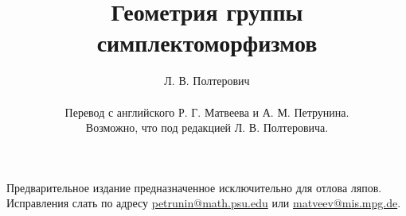 \documentclass[twoside]{book}
\begin{document}

\title{Геометрия группы симплектоморфизмов}
\author{Л. В. Полтерович\\
\\
Перевод с английского  
Р. Г. Матвеева и А. М. Петрунина.
\\
Возможно, что под редакцией Л. В. Полтеровича.
}
\date{}
\maketitle

\thispagestyle{empty}

Предварительное издание предназначенное исключительно для отлова ляпов. 
Исправления слать по адресу 
\url{petrunin@math.psu.edu}
или
\url{matveev@mis.mpg.de}.


\vfill
















{

\small

\printindex
\printindex[symb]

}

{

\sloppy

\printbibliography[heading=bibintoc]

\fussy

}

\tableofcontents
\end{document}
